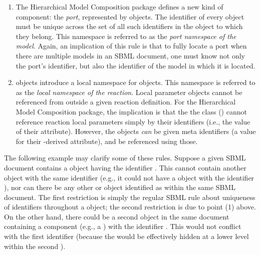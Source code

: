 \begin{enumerate}
\item The Hierarchical Model Composition package defines a new kind of
  component: the \emph{port}, represented by \Port objects.  The
  identifier of every \Port object must be unique across the set of all
  such identifiers in the \Model object to which they belong.  This
  namespace is referred to as the \emph{port namespace of the model}.
  Again, an implication of this rule is that to fully locate a port when
  there are multiple models in an SBML document, one must know not only
  the port's identifier, but also the identifier of the model in which
  it is located.

\item \Reaction objects introduce a local namespace for \LocalParameter
  objects.  This namespace is referred to as the \emph{local namespace
    of the reaction}.  Local parameter objects cannot be referenced from
  outside a given reaction definition.  For the Hierarchical Model
  Composition package, the implication is that the the \SBaseRef class
  () cannot reference reaction local parameters
  simply by their identifiers (i.e., the value of their 
  attribute).  However, the \LocalParameter objects \emph{can} be given
  meta identifiers (a value for their \SBase-derived 
  attribute), and be referenced using those.

% 


\end{enumerate}

The following example may clarify some of these rules.  Suppose a given
SBML document contains a \Model object having the identifier .
This \Model cannot contain another object with the same identifier
(e.g., it could not have a \Parameter object with the identifier
), nor can there be any other \Model or
\ExternalModelDefinition object identified as  within the
same SBML document.  The first restriction is simply the regular SBML
rule about uniqueness of identifiers throughout a \Model object; the
second restriction is due to point (1) above.  On the other hand, there
could be a second \Model object in the same document containing a
component (e.g., a \Parameter) with the identifier .  This
would not conflict with the first \Model identifier (because the
\Parameter would be effectively hidden at a lower level within the
second \Model).

